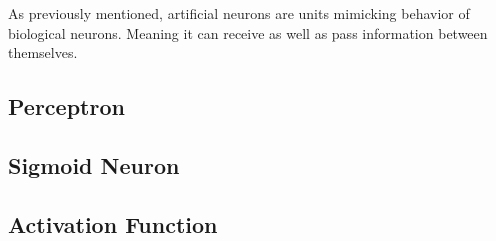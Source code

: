 As previously mentioned, artificial neurons are units mimicking behavior of biological neurons. Meaning it can receive as well as pass information between themselves.

\subsection{Perceptron}

\subsection{Sigmoid Neuron}

\subsection{Activation Function}


